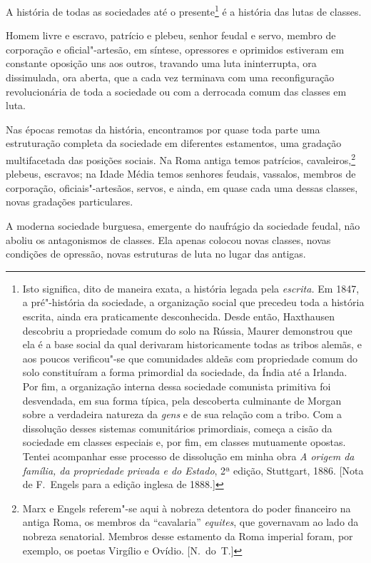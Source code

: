 A história de todas as sociedades até o
presente\footnote{ Isto significa, dito de maneira exata, a história legada
pela \textit{escrita.} Em 1847, a pré"-história da sociedade, a organização
social que precedeu toda a história escrita, ainda era praticamente
desconhecida. Desde então, Haxthausen descobriu a propriedade comum do
solo na Rússia, Maurer demonstrou que ela é a base social da qual
derivaram historicamente todas as tribos alemãs, e aos poucos
verificou"-se que comunidades aldeãs com propriedade comum do solo
constituíram a forma primordial da sociedade, da Índia até a Irlanda.
Por fim, a organização interna dessa sociedade comunista primitiva foi
desvendada, em sua forma típica, pela descoberta culminante de Morgan
sobre a verdadeira natureza da \textit{gens} e de sua relação com a
tribo. Com a dissolução desses sistemas comunitários primordiais,
começa a cisão da sociedade em classes especiais e, por fim, em classes
mutuamente opostas. Tentei acompanhar esse processo de dissolução em
minha obra \textit{A origem da família, da propriedade privada e do
Estado}, 2ª edição, Stuttgart, 1886. [Nota de F.~Engels para a edição
inglesa de 1888.]}
é a história das lutas de classes.

Homem livre e escravo, patrício e plebeu, senhor feudal e servo, membro
de corporação e oficial"-artesão, em síntese, opressores e oprimidos
estiveram em constante oposição uns aos outros, travando uma luta
ininterrupta, ora dissimulada, ora aberta, que a cada vez terminava com
uma reconfiguração revolucionária de toda a sociedade ou com a
derrocada comum das classes em luta.

Nas épocas remotas da história, encontramos por quase toda parte
uma estruturação completa da sociedade em diferentes estamentos, uma
gradação multifacetada das posições sociais. Na Roma antiga temos
patrícios, cavaleiros,\footnote{ Marx e Engels referem"-se aqui à nobreza	\EP[]
detentora do poder financeiro na antiga Roma, os membros da
“cavalaria” \textit{equites}, que governavam ao lado da nobreza
senatorial. Membros desse estamento da Roma imperial foram, por
exemplo, os poetas Virgílio e Ovídio. [N.~do~T.]} plebeus, escravos; na 
Idade Média temos senhores feudais, vassalos, membros de corporação, oficiais"-artesãos, 
servos, e ainda, em quase cada uma dessas classes, novas gradações particulares.

A moderna sociedade burguesa, emergente do naufrágio da sociedade
feudal, não aboliu os antagonismos de classes. Ela apenas colocou novas
classes, novas condições de opressão, novas estruturas de luta no lugar
das antigas.

